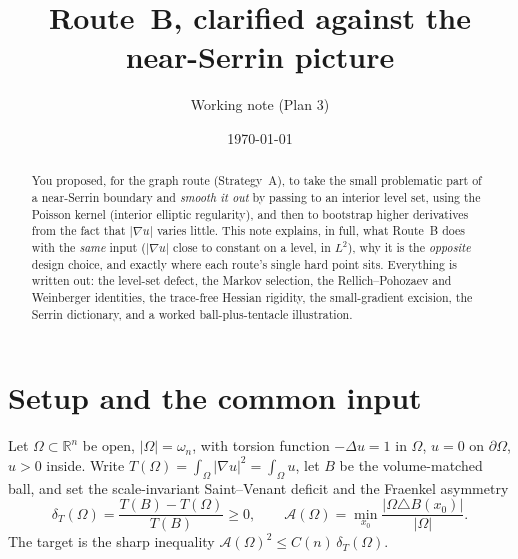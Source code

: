 \documentclass[11pt]{amsart}
\title{Route~B, clarified against the near-Serrin picture}
\author{Working note (Plan 3)}
\date{\today}
\theoremstyle{definition}
\theoremstyle{remark}
\newcommand{\Om}{\Omega}
\newcommand{\dT}{\delta_T}
\newcommand{\Asym}{\mathcal A}
\newcommand{\Rn}{\mathbb R^n}
\begin{document}
\maketitle

\begin{abstract}
You proposed, for the graph route (Strategy~A), to take the small
problematic part of a near-Serrin boundary and \emph{smooth it out} by
passing to an interior level set, using the Poisson kernel (interior
elliptic regularity), and then to bootstrap higher derivatives from the
fact that $|\nabla u|$ varies little. This note explains, in full, what
Route~B does with the \emph{same} input ($|\nabla u|$ close to constant
on a level, in $L^2$), why it is the \emph{opposite} design choice, and
exactly where each route's single hard point sits. Everything is
written out: the level-set defect, the Markov selection, the
Rellich--Pohozaev and Weinberger identities, the trace-free Hessian
rigidity, the small-gradient excision, the Serrin dictionary, and a
worked ball-plus-tentacle illustration.
\end{abstract}

\section{Setup and the common input}

Let $\Om\subset\Rn$ be open, $|\Om|=\omega_n$, with torsion function
$-\Delta u=1$ in $\Om$, $u=0$ on $\partial\Om$, $u>0$ inside. Write
$T(\Om)=\int_\Om|\nabla u|^2=\int_\Om u$, let $B$ be the volume-matched
ball, and set the scale-invariant Saint--Venant deficit and the
Fraenkel asymmetry
\[
  \dT(\Om)=\frac{T(B)-T(\Om)}{T(B)}\ge0,\qquad
  \Asym(\Om)=\min_{x_0}\frac{|\Om\triangle B(x_0)|}{|\Om|}.
\]
The target is the sharp inequality $\Asym(\Om)^2\le C(n)\,\dT(\Om)$.
\end{document}
